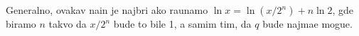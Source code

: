 Generalno, ovakav na{\cv}in je najbr{\zv}i ako ra{\cv}unamo $\ln x=\ln(x/2^n)+n\ln2$,
gde biramo $n$ takvo da $x/2^n$ bude {\sv}to bil{\zv}e 1, a samim tim, da $q$ bude najma{\nj}e mogu{\cc}e.
